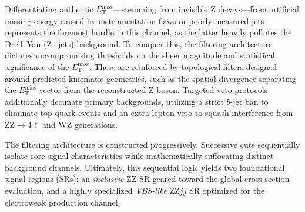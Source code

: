 Differentiating authentic $E_{\text{T}}^{\text{miss}}$—stemming from invisible $\text{Z}$ decays—from artificial missing energy caused by instrumentation flaws or poorly measured jets represents the foremost hurdle in this channel, as the latter heavily pollutes the Drell--Yan ($\text{Z}$+jets) background. To conquer this, the filtering architecture dictates uncompromising thresholds on the sheer magnitude and statistical significance of the $E_{\text{T}}^{\text{miss}}$. These are reinforced by topological filters designed around predicted kinematic geometries, such as the spatial divergence separating the $E_{\text{T}}^{\text{miss}}$ vector from the reconstructed $\text{Z}$ boson. Targeted veto protocols additionally decimate primary backgrounds, utilizing a strict $b$-jet ban to eliminate top-quark events and an extra-lepton veto to squash interference from $\text{ZZ} \to 4\ell$ and $\text{WZ}$ generations.

The filtering architecture is constructed progressively. Successive cuts sequentially isolate core signal characteristics while mathematically suffocating distinct background channels. Ultimately, this sequential logic yields two foundational signal regions (SRs): an \textit{inclusive} $\text{ZZ}$ SR geared toward the global cross-section evaluation, and a highly specialized \textit{VBS-like} $\text{ZZ}jj$ SR optimized for the electroweak production channel.

